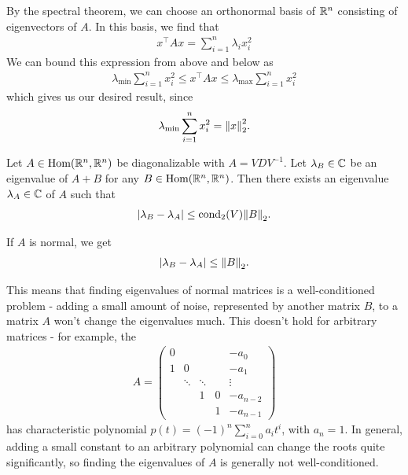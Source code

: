 \begin{proofsketch}
	By the spectral theorem, we can choose an orthonormal basis of $\mathbb{R}^n$ consisting of eigenvectors of $A$. In this basis, we find that
	\begin{align*}
		x^\top A x = \sum_{i = 1}^n \lambda_i x_i^2
	\end{align*}
	We can bound this expression from above and below as
	\begin{align*}
		\lambda_{\min} \sum_{i = 1}^n x_i^2 \leq x^\top A x \leq \lambda_{\max} \sum_{i = 1}^n x_i^2
	\end{align*}
	which gives us our desired result, since
	\begin{align*}
		\lambda_{\min} \sum_{i = 1}^n x_i^2 = \norm{x}_2^2.
	\end{align*}
\end{proofsketch}
\begin{theorem}
	Let $A \in \textnormal{Hom}(\mathbb{R}^n, \mathbb{R}^n)$ be diagonalizable with $A = V D V^{-1}$. Let $\lambda_B \in \mathbb{C}$ be an eigenvalue of $A + B$ for any $B \in \textnormal{Hom}(\mathbb{R}^n, \mathbb{R}^n)$. Then there exists an eigenvalue $\lambda_A \in \mathbb{C}$ of $A$ such that
	\begin{align*}
		\abs{\lambda_B - \lambda_A} \leq \operatorname{cond}_2(V)\norm{B}_2.
	\end{align*}
\end{theorem}
\begin{corollary}
	If $A$ is normal, we get
	\begin{align*}
		\abs{\lambda_B - \lambda_A} \leq \norm{B}_2.
	\end{align*}
\end{corollary}
This means that finding eigenvalues of normal matrices is a well-conditioned problem - adding a small amount of noise, represented by another matrix $B$, to a matrix $A$ won't change the eigenvalues much. This doesn't hold for arbitrary matrices - for example, the 
\begin{align*}
	A = \begin{pmatrix}
		0 &   &   && -a_0\\
		1 & 0 &   && -a_1\\
		  & \ddots & \ddots && \vdots\\
		  &   & 1 & 0 & -a_{n-2}\\
		  &   &   & 1 & -a_{n-1}
	\end{pmatrix}
\end{align*}
has characteristic polynomial $p(t) = (-1)^n \sum_{i = 0}^n a_it^i$, with $a_n = 1$. In general, adding a small constant to an arbitrary polynomial can change the roots quite significantly, so finding the eigenvalues of $A$ is generally not well-conditioned.
